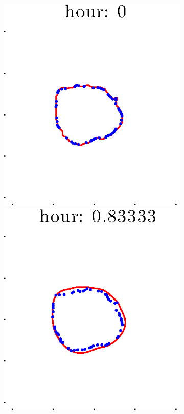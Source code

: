 \documentclass[12pt]{article}
\begin{document}
\begin{figure}[h!]
\begin{subfigure}[b]{.3\textwidth}
	\end{subfigure}
	\begin{subfigure}[b]{.3\textwidth}
	\centering
		\includegraphics[height=.15\textheight]{Pos5exp2/firsthalf/first1.eps}
		\includegraphics[height=.15\textheight]{Pos5exp2/firsthalf/first2.eps}

\end{subfigure}
\end{figure}
\end{document}

